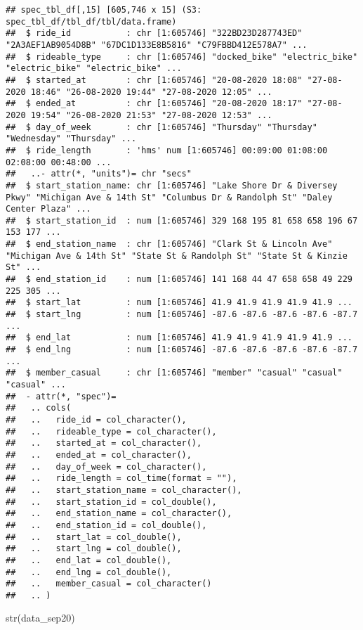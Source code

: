 \documentclass[
]{article}
\newenvironment{Shaded}{\begin{snugshade}}{\end{snugshade}}
\newcommand{\FunctionTok}[1]{\textcolor[rgb]{0.00,0.00,0.00}{#1}}
\newcommand{\NormalTok}[1]{#1}
\begin{document}
\begin{verbatim}
## spec_tbl_df[,15] [605,746 x 15] (S3: spec_tbl_df/tbl_df/tbl/data.frame)
##  $ ride_id           : chr [1:605746] "322BD23D287743ED" "2A3AEF1AB9054D8B" "67DC1D133E8B5816" "C79FBBD412E578A7" ...
##  $ rideable_type     : chr [1:605746] "docked_bike" "electric_bike" "electric_bike" "electric_bike" ...
##  $ started_at        : chr [1:605746] "20-08-2020 18:08" "27-08-2020 18:46" "26-08-2020 19:44" "27-08-2020 12:05" ...
##  $ ended_at          : chr [1:605746] "20-08-2020 18:17" "27-08-2020 19:54" "26-08-2020 21:53" "27-08-2020 12:53" ...
##  $ day_of_week       : chr [1:605746] "Thursday" "Thursday" "Wednesday" "Thursday" ...
##  $ ride_length       : 'hms' num [1:605746] 00:09:00 01:08:00 02:08:00 00:48:00 ...
##   ..- attr(*, "units")= chr "secs"
##  $ start_station_name: chr [1:605746] "Lake Shore Dr & Diversey Pkwy" "Michigan Ave & 14th St" "Columbus Dr & Randolph St" "Daley Center Plaza" ...
##  $ start_station_id  : num [1:605746] 329 168 195 81 658 658 196 67 153 177 ...
##  $ end_station_name  : chr [1:605746] "Clark St & Lincoln Ave" "Michigan Ave & 14th St" "State St & Randolph St" "State St & Kinzie St" ...
##  $ end_station_id    : num [1:605746] 141 168 44 47 658 658 49 229 225 305 ...
##  $ start_lat         : num [1:605746] 41.9 41.9 41.9 41.9 41.9 ...
##  $ start_lng         : num [1:605746] -87.6 -87.6 -87.6 -87.6 -87.7 ...
##  $ end_lat           : num [1:605746] 41.9 41.9 41.9 41.9 41.9 ...
##  $ end_lng           : num [1:605746] -87.6 -87.6 -87.6 -87.6 -87.7 ...
##  $ member_casual     : chr [1:605746] "member" "casual" "casual" "casual" ...
##  - attr(*, "spec")=
##   .. cols(
##   ..   ride_id = col_character(),
##   ..   rideable_type = col_character(),
##   ..   started_at = col_character(),
##   ..   ended_at = col_character(),
##   ..   day_of_week = col_character(),
##   ..   ride_length = col_time(format = ""),
##   ..   start_station_name = col_character(),
##   ..   start_station_id = col_double(),
##   ..   end_station_name = col_character(),
##   ..   end_station_id = col_double(),
##   ..   start_lat = col_double(),
##   ..   start_lng = col_double(),
##   ..   end_lat = col_double(),
##   ..   end_lng = col_double(),
##   ..   member_casual = col_character()
##   .. )
\end{verbatim}

\begin{Shaded}
\begin{Highlighting}[]
\FunctionTok{str}\NormalTok{(data\_sep20)}
\end{Highlighting}
\end{Shaded}
\end{document}
